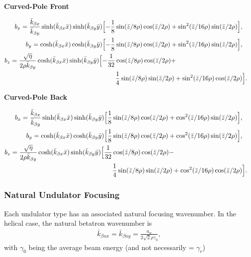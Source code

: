 \documentclass[12pt]{article}%
\begin{document}
{\bf Curved-Pole Front}


\begin{align}
b_x  =  \frac{\bar{k}_{\beta x}}{\bar{k}_{\beta y}} \sinh(\bar{k}_{\beta x} \bar{x})\sinh(\bar{k}_{\beta y} \bar{y}) \Bigl[ -\frac{1}{8}& \sin(\bar{z}/8\rho) \cos(\bar{z} / 2\rho) +   \sin^2(\bar{z}/16\rho) \sin(\bar{z} / 2\rho)   \Bigr],    &    \\
b_y   =  \cosh(\bar{k}_{\beta x} \bar{x})\cosh(\bar{k}_{\beta y} \bar{y}) \Bigl[ -\frac{1}{8}& \sin(\bar{z}/8\rho) \cos(\bar{z} / 2\rho) +   \sin^2(\bar{z}/16\rho) \sin(\bar{z} / 2\rho)   \Bigr], \\
b_z  =  \frac{\sqrt{\eta}}{2 \rho \bar{k}_{\beta y}}  \cosh(\bar{k}_{\beta x} \bar{x})\sinh(\bar{k}_{\beta y} \bar{y})  \Bigl[ -\frac{1}{32} & \cos(\bar{z}/8\rho) \cos(\bar{z}/2\rho) + \nonumber \\
                                                &\frac{1}{4}  \sin(\bar{z}/8\rho)\sin(\bar{z}/2\rho) + \sin^2  (\bar{z}/16\rho) \cos(\bar{z}/2\rho)  \Bigr] .
\end{align}

{\bf Curved-Pole Back}

\begin{align}
b_x  =  \frac{\bar{k}_{\beta x}}{\bar{k}_{\beta y}} \sinh(\bar{k}_{\beta x} \bar{x})\sinh(\bar{k}_{\beta y} \bar{y}) \Bigl[ \frac{1}{8}& \sin(\bar{z}/8\rho) \cos(\bar{z} / 2\rho) +   \cos^2(\bar{z}/16\rho) \sin(\bar{z} / 2\rho)   \Bigr],    &    \\
b_y   =  \cosh(\bar{k}_{\beta x} \bar{x})\cosh(\bar{k}_{\beta y} \bar{y}) \Bigl[ \frac{1}{8}& \sin(\bar{z}/8\rho) \cos(\bar{z} / 2\rho) +   \cos^2(\bar{z}/16\rho) \sin(\bar{z} / 2\rho)   \Bigr], \\
b_z  =  \frac{\sqrt{\eta}}{2 \rho \bar{k}_{\beta y}}  \cosh(\bar{k}_{\beta x} \bar{x})\sinh(\bar{k}_{\beta y} \bar{y})  \Bigl[ \frac{1}{32} & \cos(\bar{z}/8\rho) \cos(\bar{z}/2\rho) - \nonumber \\
                                                &\frac{1}{4}  \sin(\bar{z}/8\rho)\sin(\bar{z}/2\rho) + \cos^2  (\bar{z}/16\rho) \cos(\bar{z}/2\rho)  \Bigr] .
\end{align}



\subsubsection{Natural Undulator Focusing}

Each undulator type has an associated natural focusing wavenumber. In the helical case, the natural betatron wavenumber is
\begin{align}
\bar{k}_{\beta n x} = \bar{k}_{\beta n y} = \frac{a_w}{2 \sqrt{2} \rho \gamma_0},
\end{align}
with $\gamma_0$ being the average beam energy (and not necessarily = $\gamma_r$)
\end{document}
